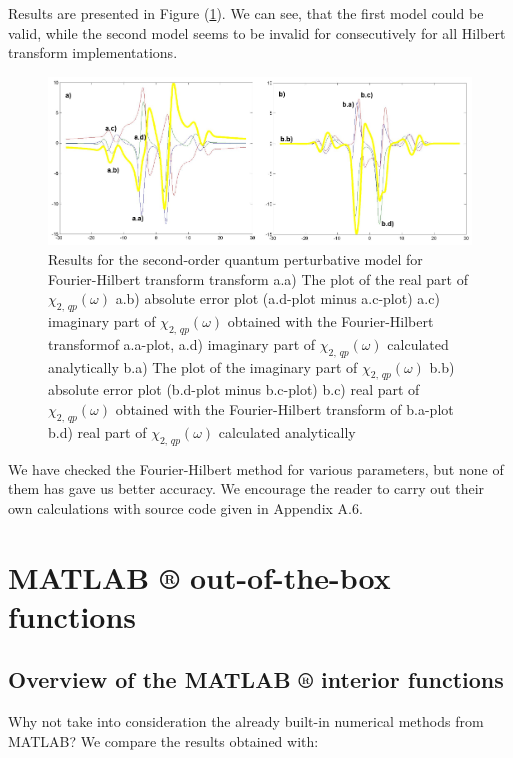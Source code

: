 \documentclass[12pt,twoside,a4paper]{article}
\numberwithin{equation}{subsection}
\numberwithin{figure}{subsection}
\begin{document}
Results are presented in Figure (\ref{fig:four_qp2}). We can see, that the first model could be valid, while the second model seems to
be invalid for consecutively for all Hilbert transform implementations.

\begin{figure} 
  \includegraphics[width=150mm]{img/four_qp2.png}
  \caption{Results for the second-order quantum perturbative model for Fourier-Hilbert transform transform
     a.a) The plot of the real part of ${\chi_{2, \,qp}}(\omega )$
     a.b) absolute error plot (a.d-plot minus a.c-plot)
     a.c) imaginary part of $\chi_{2, \, qp} (\omega )$ obtained with the Fourier-Hilbert transformof a.a-plot, 
     a.d) imaginary part of $\chi_{2, \, qp} (\omega )$ calculated analytically 
     b.a) The plot of the imaginary part of ${\chi_{2, \, qp}}(\omega )$ 
     b.b) absolute error plot (b.d-plot minus b.c-plot)
     b.c) real part of $\chi_{2, \, qp} (\omega )$ obtained with the Fourier-Hilbert transform of b.a-plot 
     b.d) real part of $\chi_{2, \, qp} (\omega )$ calculated analytically 
     \label{fig:four_qp2}
     }
\end{figure} 

We have checked the Fourier-Hilbert method for various parameters, but none of them has gave us better accuracy. We
encourage the reader to carry out their own calculations with source code given in Appendix A.6.

\section{MATLAB ® out-of-the-box functions} \label{chap:matlab}

\subsection{Overview of the MATLAB ® interior functions} \label{chap:matlab_overview}

Why not take into consideration the already built-in numerical methods from MATLAB? We compare the results obtained with: 
\end{document}
